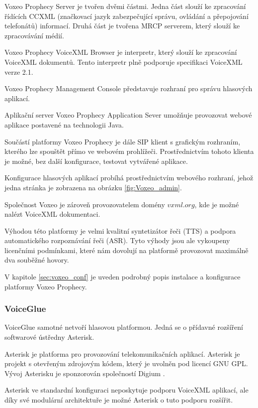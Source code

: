 \documentclass[ing,male,java,dept460]{diploma}						%
\begin{document}
Voxeo Prophecy Server je tvořen dvěmi částmi. Jedna část slouží ke zpracování řídících CCXML (značkovací jazyk zabezpečující správu, ovládání a přepojování telefonátů) informací. Druhá část je tvořena MRCP serverem, který slouží ke zpracovávání médií.

Voxeo Prophecy VoiceXML Browser je interpretr, který slouží ke zpracování VoiceXML dokumentů. Tento interpretr plně podporuje specifikaci VoiceXML verze 2.1.

Voxeo Prophecy Management Console představuje rozhraní pro správu hlasových aplikací.

Aplikační server Voxeo Prophecy Application Sever umožňuje provozovat webové aplikace postavené na technologii Java.

Součástí platformy Voxeo Prophecy je dále SIP klient s grafickým rozhraním, kterého lze spouštět přímo ve webovém prohlížeči. Prostřednictvím tohoto klienta je možné, bez další konfigurace, testovat vytvářené aplikace.

Konfigurace hlasových aplikací probíhá prostřednictvím webového rozhraní, jehož jedna stránka je zobrazena na obrázku \ref{fig:Voxeo_admin}.

Společnost Voxeo je zároveň provozovatelem domény $vxml.org$, kde je možné nalézt VoiceXML dokumentaci.

Výhodou této platformy je velmi kvalitní syntetizátor řeči (TTS) a podpora automatického rozpoznávání řeči (ASR). Tyto výhody jsou ale vykoupeny licenčními podmínkami, které nám dovolují na platformě provozovat maximálně dva souběžné hovory.

V kapitole \ref{sec:voxeo_conf} je uveden podrobný popis instalace a konfigurace platformy Voxeo Prophecy.

\subsubsection{VoiceGlue}
\label{sec:voiceglue}
VoiceGlue samotné netvoří hlasovou platformou. Jedná se o přídavné rozšíření softwarové ústředny Asterisk.

Asterisk je platforma pro provozování telekomunikačních aplikací. Asterisk je projekt s otevřeným zdrojovým kódem, který je uvolněn pod licencí GNU GPL. Vývoj Asterisku je sponzorován společností Digium \cite{asterisk_org}.

Asterisk ve standardní konfiguraci neposkytuje podporu VoiceXML aplikací, ale díky své modulární architektuře je možné Asterisk o tuto podporu rozšířit.
\end{document}
